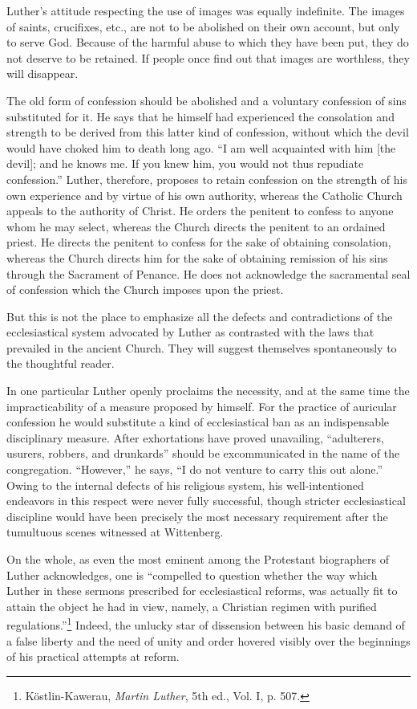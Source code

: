 Luther’s attitude respecting the use of images was equally indefinite. The
images of saints, crucifixes, etc., are not to be abolished on their own
account, but only to serve God. Because of the harmful abuse to which
they have been put, they do not deserve to be retained. If people once find
out that images are worthless, they will disappear.

The old form of confession should be abolished and a voluntary confession
of sins substituted for it. He says that he himself had experienced the consolation
and strength to be derived from this latter kind of confession,
without which the devil would have choked him to death long ago. “I am
well acquainted with him [the devil]; and he knows me. If you knew him,
you would not thus repudiate confession.” Luther, therefore, proposes to
retain confession on the strength of his own experience and by virtue of
his own authority, whereas the Catholic Church appeals to the authority
of Christ. He orders the penitent to confess to anyone whom he may select,
whereas the Church directs the penitent to an ordained priest. He directs
the penitent to confess for the sake of obtaining consolation, whereas
the Church directs him for the sake of obtaining remission of his sins
through the Sacrament of Penance. He does not acknowledge the sacramental seal
of confession which the Church imposes upon the priest.

But this is not the place to emphasize all the defects and contradictions
of the ecclesiastical system advocated by Luther as contrasted with the laws
that prevailed in the ancient Church. They will suggest themselves spontaneously
to the thoughtful reader.

In one particular Luther openly proclaims the necessity, and at the same
time the impracticability of a measure proposed by himself. For the practice
of auricular confession he would substitute a kind of ecclesiastical ban as
an indispensable disciplinary measure. After exhortations have proved unavailing,
“adulterers, usurers, robbers, and drunkards” should be excommunicated
in the name of the congregation. “However,” he says, “I do not
venture to carry this out alone.” Owing to the internal defects of his
religious system, his well-intentioned endeavors in this respect were never fully
successful, though stricter ecclesiastical discipline would have been precisely
the most necessary requirement after the tumultuous scenes witnessed at
Wittenberg.

On the whole, as even the most eminent among the Protestant biographers
of Luther acknowledges, one is “compelled to question whether the way
which Luther in these sermons prescribed for ecclesiastical reforms, was
actually fit to attain the object he had in view, namely, a Christian regimen
with purified regulations.”\footnote{Köstlin-Kawerau, \textit{Martin Luther}, 5th ed., Vol. I, p. 507.}
Indeed, the unlucky star of dissension between
his basic demand of a false liberty and the need of unity and order
hovered visibly over the beginnings of his practical attempts at reform.

